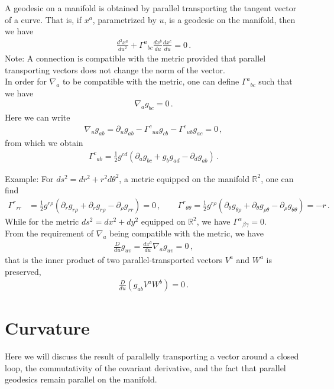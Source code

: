 \documentclass[11pt, onesided]{book}
\theoremstyle{break}
\theoremstyle{break}
\newcommand{\R}{\mathbb{R}}
\newcommand{\pd}{\partial}
\newcommand{\note}{\color{red}Note: \color{black}}
\newcommand{\example}{\color{green}Example: \color{black}}
\begin{document}
A geodesic on a manifold is obtained by parallel transporting the tangent vector of a curve. That is, if $x^a$, parametrized by $u$, is a geodesic on the manifold, then we have
\begin{align*}
\frac{d^2x^a}{du^2} + \Gamma^{a}{}_{bc} \frac{dx^b}{du}\frac{dx^c}{du}  = 0\,.
\end{align*}
\note A connection is compatible with the metric provided that parallel transporting vectors does not change the norm of the vector. \\

In order for $\nabla_a$ to be compatible with the metric, one can define $\Gamma^{a}{}_{bc}$ such that we have
\begin{align*}
\nabla_a g_{bc} = 0\,.
\end{align*}
Here we can write
\begin{align*}
\nabla_u g_{ab} = \pd_u g_{ab} - \Gamma^c{}_{ua}g_{cb} - \Gamma^c{}_{ub}g_{ac} = 0\,,
\end{align*}
from which we obtain
\begin{align*}
\Gamma^c{}_{ab} = \frac{1}{2}g^{cd}\left(\pd_a g_{bc} + g_bg_{ad} - \pd_d g_{ab}\right)\,.
\end{align*}

\example
For $ds^2 = dr^2 + r^2 d\theta^2$, a metric equipped on the manifold $\R^2$, one can find
\begin{align*}
\Gamma^r{}_{rr} &= \frac{1}{2}g^{r\rho} \left( \pd_r g_{r\rho} + \pd_r g_{r\rho} - \pd_\rho g_{rr}\right) = 0\,,\qquad
\Gamma^r{}_{\theta\theta} = \frac{1}{2}g^{r\rho}\left( \pd_\theta g_{\theta \rho}+\pd_\theta g_{\rho \theta} -\pd_\rho g_{\theta\theta}\right) = -r\,.
\end{align*}
While for the metric $ds^2 = dx^2 + dy^2$ equipped on $\R^2$, we have $\Gamma^\alpha{}_{\beta \gamma} = 0$. \\

From the requirement of $\nabla_a$ being compatible with the metric, we have
\begin{align*}
\frac{D}{du}g_{uv} = \frac{dx^a}{du}\nabla_a g_{uv} = 0\,,
\end{align*}
that is the inner product of two parallel-transported vectors $V^a$ and $W^a$ is preserved,
\begin{align*}
\frac{D}{du}\left( g_{ab} V^a W^b \right) = 0\,.
\end{align*}


\section[Curvature]{\color{red}Curvature \color{black}}
Here we will discuss the result of parallelly transporting a vector around a closed loop, the commutativity of the covariant derivative, and the fact that parallel geodesics remain parallel on the manifold.\\
\end{document}
